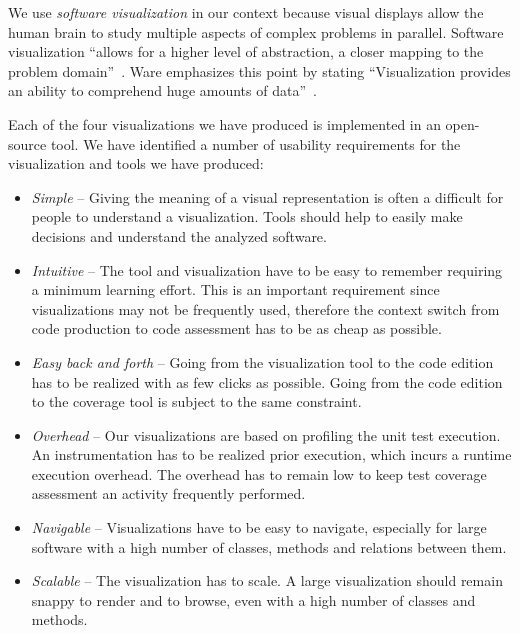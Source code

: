 \documentclass[runningheads]{llncs}
\begin{document}
We use \emph{software visualization} in our context because visual displays allow the human brain to study multiple aspects of complex problems in parallel. Software visualization ``allows for a higher level of abstraction, a closer mapping to the problem domain''~\cite{Petr95a}. Ware emphasizes this point by stating ``Visualization provides an ability to comprehend huge amounts of data''~\cite{Ware04a}. 

Each of the four visualizations we have produced is implemented in an open-source tool.  %
We have identified a number of usability requirements for the visualization and tools we have produced:

\begin{itemize}
\item \emph{Simple} -- Giving the meaning of a visual representation is often a difficult for people to understand a visualization. Tools should help to easily make decisions and understand the analyzed software.

\item \emph{Intuitive} -- The tool and visualization have to be easy to remember requiring a minimum learning effort. This is an important requirement since visualizations may not be frequently used, therefore the context switch from code production to code assessment has to be as cheap as possible. 

\item \emph{Easy back and forth} -- Going from the visualization tool to the code edition has to be realized with as few clicks as possible. Going from the code edition to the coverage tool is subject to the same constraint. 

\item \emph{Overhead} -- Our visualizations are based on profiling the unit test execution. An instrumentation has to be realized prior execution, which incurs a runtime execution overhead. The overhead has to remain low to keep test coverage assessment an activity frequently performed. 

\item \emph{Navigable} -- Visualizations have to be easy to navigate, especially for large software with a high number of classes, methods and relations between them.

\item \emph{Scalable} -- The visualization has to scale. A large visualization should remain snappy to render and to browse, even with a high number of classes and methods.
\end{itemize}
\end{document}
